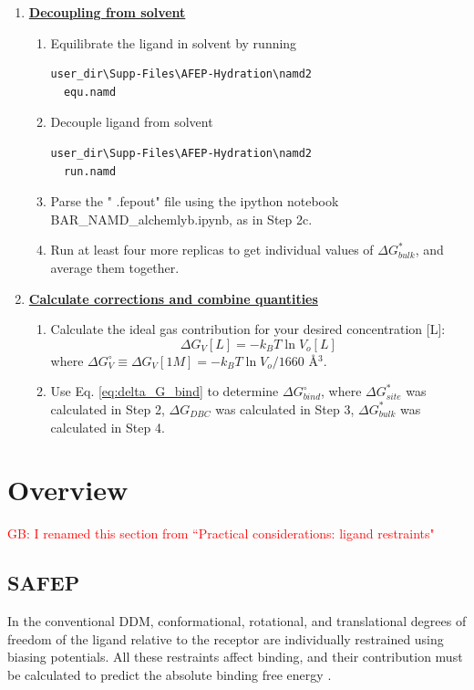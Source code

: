 \documentclass[9pt,tutorial]{livecoms}
\newcommand{\grace}[1]{\textcolor{red}{GB: #1}}
\begin{document}
\begin{enumerate}[left=0pt .. \parindent]
\begin{enumerate}
\end{enumerate}
\item  {\bf \hyperref[sec:11]{Decoupling from solvent}}
\begin{enumerate}
\item Equilibrate the ligand in solvent by running
\begin{verbatim}
user_dir\Supp-Files\AFEP-Hydration\namd2
  equ.namd
\end{verbatim}
\item Decouple ligand from solvent
\begin{verbatim}
user_dir\Supp-Files\AFEP-Hydration\namd2
  run.namd
\end{verbatim}
\item Parse the " .fepout" file using the ipython notebook BAR\_NAMD\_alchemlyb.ipynb, as in Step 2c. 
\item Run at least four more replicas to get individual values of $\Delta G^*_{bulk}$, and average them together. 
\end{enumerate}
\item {\bf \hyperref[sec:12]{Calculate corrections and combine  quantities}}
\begin{enumerate}
\item Calculate the ideal gas contribution for your desired concentration [L]:
$$\Delta G_V[L]=-k_B T\ln V_o[L]$$
where $\Delta G_V^\circ \equiv \Delta G_V[1M] = -k_B T\ln V_o/1660$ \AA$^3$.  
\item Use Eq. \ref{eq:delta_G_bind}  to determine $\Delta G_{bind}^\circ$, where $\Delta G^*_{site}$ was calculated in Step 2, $\Delta G_{DBC}$ was calculated in Step 3, $\Delta G^*_{bulk}$ was calculated in Step 4.
\end{enumerate}
\end{enumerate}
\section{Overview}
\grace{I renamed this section from ``Practical considerations: ligand restraints"} 
\subsection{SAFEP}
In the conventional DDM, conformational, rotational, and translational degrees of freedom of the ligand relative to the receptor are individually restrained using biasing potentials.
All these restraints affect binding, and their contribution must be calculated to predict the absolute binding free energy \cite{Hermans1997, Gilson1997, Boresch2003, Hamelberg2004, Woo2005, Deng2006}.
\end{document}
